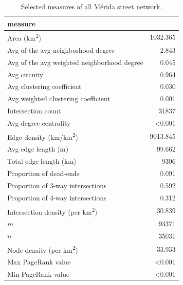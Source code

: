 \begin{table}[htbp]
  \centering
  \caption{Selected measures of all Mérida street network.}
  \label{tab:measures_urban_city}
  \small
  \begin{tabular}{ l r }
    \toprule
    measure                                          &              \\
    \midrule
    Area (km\textsuperscript{2})                     & 1032.365    \\
    Avg of the avg neighborhood degree               & 2.843        \\
    Avg of the avg weighted neighborhood degree      & 0.045       \\
    Avg circuity                                     & 0.964 \\
    Avg clustering coefficient                       & 0.030        \\
    Avg weighted clustering coefficient              & 0.001 \\
    Intersection count                               & 31837      \\
    Avg degree centrality                            & \textless0.001          \\
    Edge density (km/km\textsuperscript{2})          & 9013.845         \\
    Avg edge length (m)                              & 99.662          \\
    Total edge length (km)                           & 9306      \\
    Proportion of dead-ends                          & 0.091          \\
    Proportion of 3-way intersections                & 0.592         \\
    Proportion of 4-way intersections                & 0.312          \\
    Intersection density (per km\textsuperscript{2}) & 30.839          \\
    $m$                                              & 93371     \\
    $n$                                              & 35031      \\
    Node density (per km\textsuperscript{2})         & 33.933         \\
    Max PageRank value                               & \textless0.001 \\
    Min PageRank value                               & \textless0.001 \\

\end{tabular}
\end{table}
